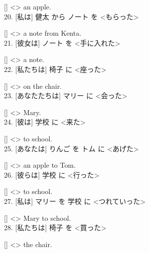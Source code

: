 \documentclass[uplatex,
paper=a4,
fontsize=18pt,
jafontsize=16pt,
number_of_lines=30,
line_length=30zh,
baselineskip=25pt,
]{jlreq}
\begin{document}
  [\hspace{3em}] <\hspace{3em}> an apple.
\\

20.  [私は] 健太 から ノート を <もらった>

  [\hspace{3em}] <\hspace{3em}> a note from Kenta.
\\

21.  [彼女は] ノート を <手に入れた>

  [\hspace{3em}] <\hspace{3em}> a note.
\\

22.  [私たちは] 椅子 に <座った>

  [\hspace{3em}] <\hspace{3em}> on the chair.
\\

23.  [あなたたちは] マリー に <会った>

  [\hspace{3em}] <\hspace{3em}> Mary.
\\

24.  [彼は] 学校 に <来た>

  [\hspace{3em}] <\hspace{3em}> to school.
\\

25.  [あなたは] りんご を トム に <あげた>

  [\hspace{3em}] <\hspace{3em}> an apple to Tom.
\\

26.  [彼らは] 学校 に <行った>

  [\hspace{3em}] <\hspace{3em}> to school.
\\

27.  [私は] マリー を 学校 に <つれていった>

  [\hspace{3em}] <\hspace{3em}> Mary to school.
\\

28.  [私たちは] 椅子 を <買った>

  [\hspace{3em}] <\hspace{3em}> the chair.
\\
\end{document}
